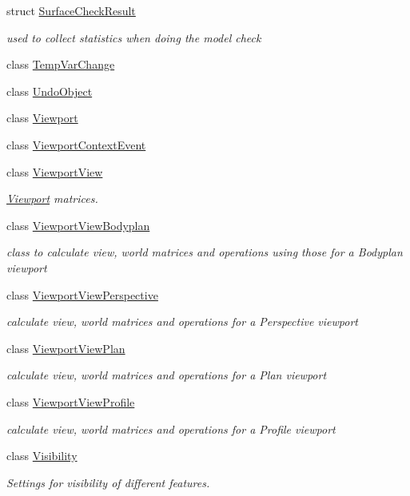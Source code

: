 \begin{DoxyCompactItemize}
struct \hyperlink{structShipCAD_1_1SurfaceCheckResult}{Surface\+Check\+Result}
\begin{DoxyCompactList}\small\item\em used to collect statistics when doing the model check \end{DoxyCompactList}\item 
class \hyperlink{classShipCAD_1_1TempVarChange}{Temp\+Var\+Change}
\item 
class \hyperlink{classShipCAD_1_1UndoObject}{Undo\+Object}
\item 
class \hyperlink{classShipCAD_1_1Viewport}{Viewport}
\item 
class \hyperlink{classShipCAD_1_1ViewportContextEvent}{Viewport\+Context\+Event}
\item 
class \hyperlink{classShipCAD_1_1ViewportView}{Viewport\+View}
\begin{DoxyCompactList}\small\item\em \hyperlink{classShipCAD_1_1Viewport}{Viewport} matrices. \end{DoxyCompactList}\item 
class \hyperlink{classShipCAD_1_1ViewportViewBodyplan}{Viewport\+View\+Bodyplan}
\begin{DoxyCompactList}\small\item\em class to calculate view, world matrices and operations using those for a Bodyplan viewport \end{DoxyCompactList}\item 
class \hyperlink{classShipCAD_1_1ViewportViewPerspective}{Viewport\+View\+Perspective}
\begin{DoxyCompactList}\small\item\em calculate view, world matrices and operations for a Perspective viewport \end{DoxyCompactList}\item 
class \hyperlink{classShipCAD_1_1ViewportViewPlan}{Viewport\+View\+Plan}
\begin{DoxyCompactList}\small\item\em calculate view, world matrices and operations for a Plan viewport \end{DoxyCompactList}\item 
class \hyperlink{classShipCAD_1_1ViewportViewProfile}{Viewport\+View\+Profile}
\begin{DoxyCompactList}\small\item\em calculate view, world matrices and operations for a Profile viewport \end{DoxyCompactList}\item 
class \hyperlink{classShipCAD_1_1Visibility}{Visibility}
\begin{DoxyCompactList}\small\item\em Settings for visibility of different features. \end{DoxyCompactList}\end{DoxyCompactItemize}
